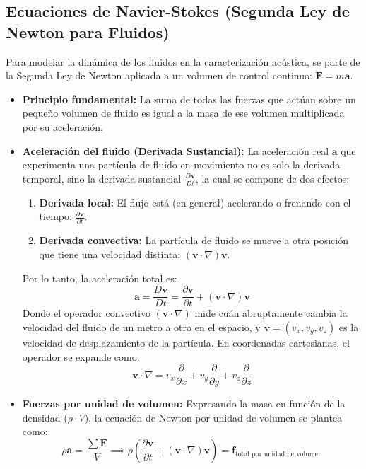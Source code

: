 \documentclass[11pt,letterpaper]{article}
\begin{document}
\subsection{Ecuaciones de Navier-Stokes (Segunda Ley de Newton para Fluidos)}

Para modelar la dinámica de los fluidos en la caracterización acústica, se parte de la Segunda Ley de Newton aplicada a un volumen de control continuo: $\mathbf{F} = m\mathbf{a}$.

\begin{itemize}
    \item \textbf{Principio fundamental:} La suma de todas las fuerzas que actúan sobre un pequeño volumen de fluido es igual a la masa de ese volumen multiplicada por su aceleración.
    
    \item \textbf{Aceleración del fluido (Derivada Sustancial):} La aceleración real $\mathbf{a}$ que experimenta una partícula de fluido en movimiento no es solo la derivada temporal, sino la derivada sustancial $\frac{D\mathbf{v}}{Dt}$, la cual se compone de dos efectos:
    \begin{enumerate}
        \item \textbf{Derivada local:} El flujo está (en general) acelerando o frenando con el tiempo: $\frac{\partial \mathbf{v}}{\partial t}$.
        \item \textbf{Derivada convectiva:} La partícula de fluido se mueve a otra posición que tiene una velocidad distinta: $(\mathbf{v} \cdot \nabla)\mathbf{v}$.
    \end{enumerate}
    Por lo tanto, la aceleración total es:
    \begin{equation}
        \mathbf{a} = \frac{D\mathbf{v}}{Dt} = \frac{\partial \mathbf{v}}{\partial t} + (\mathbf{v} \cdot \nabla)\mathbf{v}
    \end{equation}
    Donde el operador convectivo $(\mathbf{v} \cdot \nabla)$ mide cuán abruptamente cambia la velocidad del fluido de un metro a otro en el espacio, y $\mathbf{v} = (v_x, v_y, v_z)$ es la velocidad de desplazamiento de la partícula. En coordenadas cartesianas, el operador se expande como:
    \begin{equation}
        \mathbf{v} \cdot \nabla = v_x \frac{\partial}{\partial x} + v_y \frac{\partial}{\partial y} + v_z \frac{\partial}{\partial z}
    \end{equation}

    \item \textbf{Fuerzas por unidad de volumen:} Expresando la masa en función de la densidad ($\rho \cdot V$), la ecuación de Newton por unidad de volumen se plantea como:
    \begin{equation}
        \rho \mathbf{a} = \frac{\sum \mathbf{F}}{V} \implies \rho \left( \frac{\partial \mathbf{v}}{\partial t} + (\mathbf{v} \cdot \nabla)\mathbf{v} \right) = \mathbf{f}_{\text{total por unidad de volumen}}
    \end{equation}


\end{itemize}
\end{document}
